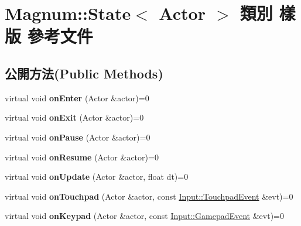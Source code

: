 \hypertarget{class_magnum_1_1_state}{}\section{Magnum\+:\+:State$<$ Actor $>$ 類別 樣版 參考文件}
\label{class_magnum_1_1_state}
\subsection*{公開方法(Public Methods)}
\begin{DoxyCompactItemize}
\item 
virtual void {\bfseries on\+Enter} (Actor \&actor)=0\hypertarget{class_magnum_1_1_state_adbaf4dd4ed49975451cf8901e8ff00ca}{}\label{class_magnum_1_1_state_adbaf4dd4ed49975451cf8901e8ff00ca}

\item 
virtual void {\bfseries on\+Exit} (Actor \&actor)=0\hypertarget{class_magnum_1_1_state_accc1fbbdc3ec1e4880eb8585d6bbbc2a}{}\label{class_magnum_1_1_state_accc1fbbdc3ec1e4880eb8585d6bbbc2a}

\item 
virtual void {\bfseries on\+Pause} (Actor \&actor)=0\hypertarget{class_magnum_1_1_state_a7fd810392466ae31954b0b7198aa355b}{}\label{class_magnum_1_1_state_a7fd810392466ae31954b0b7198aa355b}

\item 
virtual void {\bfseries on\+Resume} (Actor \&actor)=0\hypertarget{class_magnum_1_1_state_a0136a38e03531640a119f6db5774bbfc}{}\label{class_magnum_1_1_state_a0136a38e03531640a119f6db5774bbfc}

\item 
virtual void {\bfseries on\+Update} (Actor \&actor, float dt)=0\hypertarget{class_magnum_1_1_state_a025b09a6582800e47c8f120eb4b53cf3}{}\label{class_magnum_1_1_state_a025b09a6582800e47c8f120eb4b53cf3}

\item 
virtual void {\bfseries on\+Touchpad} (Actor \&actor, const \hyperlink{class_magnum_1_1_input_1_1_touchpad_event}{Input\+::\+Touchpad\+Event} \&evt)=0\hypertarget{class_magnum_1_1_state_ac9e9adcb9f9362f5c93a44f4530a0910}{}\label{class_magnum_1_1_state_ac9e9adcb9f9362f5c93a44f4530a0910}

\item 
virtual void {\bfseries on\+Keypad} (Actor \&actor, const \hyperlink{class_magnum_1_1_input_1_1_gamepad_event}{Input\+::\+Gamepad\+Event} \&evt)=0\hypertarget{class_magnum_1_1_state_a1140ae7d45008bc099af79d440d45820}{}\label{class_magnum_1_1_state_a1140ae7d45008bc099af79d440d45820}


\end{DoxyCompactItemize}
